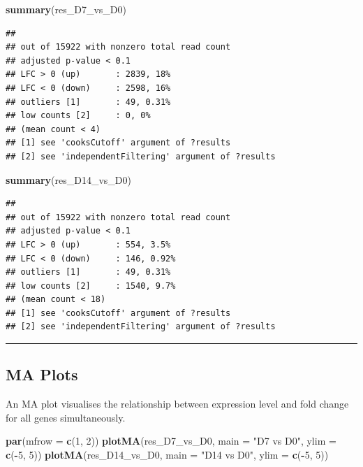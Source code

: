 \documentclass[
]{article}
\newenvironment{Shaded}{\begin{snugshade}}{\end{snugshade}}
\newcommand{\AttributeTok}[1]{\textcolor[rgb]{0.13,0.29,0.53}{#1}}
\newcommand{\DecValTok}[1]{\textcolor[rgb]{0.00,0.00,0.81}{#1}}
\newcommand{\FunctionTok}[1]{\textcolor[rgb]{0.13,0.29,0.53}{\textbf{#1}}}
\newcommand{\NormalTok}[1]{#1}
\newcommand{\SpecialCharTok}[1]{\textcolor[rgb]{0.81,0.36,0.00}{\textbf{#1}}}
\newcommand{\StringTok}[1]{\textcolor[rgb]{0.31,0.60,0.02}{#1}}
\begin{document}
\begin{Shaded}
\begin{Highlighting}[]
\FunctionTok{summary}\NormalTok{(res\_D7\_vs\_D0)}
\end{Highlighting}
\end{Shaded}

\begin{verbatim}
## 
## out of 15922 with nonzero total read count
## adjusted p-value < 0.1
## LFC > 0 (up)       : 2839, 18%
## LFC < 0 (down)     : 2598, 16%
## outliers [1]       : 49, 0.31%
## low counts [2]     : 0, 0%
## (mean count < 4)
## [1] see 'cooksCutoff' argument of ?results
## [2] see 'independentFiltering' argument of ?results
\end{verbatim}

\begin{Shaded}
\begin{Highlighting}[]
\FunctionTok{summary}\NormalTok{(res\_D14\_vs\_D0)}
\end{Highlighting}
\end{Shaded}

\begin{verbatim}
## 
## out of 15922 with nonzero total read count
## adjusted p-value < 0.1
## LFC > 0 (up)       : 554, 3.5%
## LFC < 0 (down)     : 146, 0.92%
## outliers [1]       : 49, 0.31%
## low counts [2]     : 1540, 9.7%
## (mean count < 18)
## [1] see 'cooksCutoff' argument of ?results
## [2] see 'independentFiltering' argument of ?results
\end{verbatim}

\begin{center}\rule{0.5\linewidth}{0.5pt}\end{center}

\subsection{MA Plots}\label{ma-plots}

An MA plot visualises the relationship between expression level and fold
change for all genes simultaneously.

\begin{Shaded}
\begin{Highlighting}[]
\FunctionTok{par}\NormalTok{(}\AttributeTok{mfrow =} \FunctionTok{c}\NormalTok{(}\DecValTok{1}\NormalTok{, }\DecValTok{2}\NormalTok{))}
\FunctionTok{plotMA}\NormalTok{(res\_D7\_vs\_D0,  }\AttributeTok{main =} \StringTok{"D7 vs D0"}\NormalTok{,  }\AttributeTok{ylim =} \FunctionTok{c}\NormalTok{(}\SpecialCharTok{{-}}\DecValTok{5}\NormalTok{, }\DecValTok{5}\NormalTok{))}
\FunctionTok{plotMA}\NormalTok{(res\_D14\_vs\_D0, }\AttributeTok{main =} \StringTok{"D14 vs D0"}\NormalTok{, }\AttributeTok{ylim =} \FunctionTok{c}\NormalTok{(}\SpecialCharTok{{-}}\DecValTok{5}\NormalTok{, }\DecValTok{5}\NormalTok{))}
\end{Highlighting}
\end{Shaded}
\end{document}
